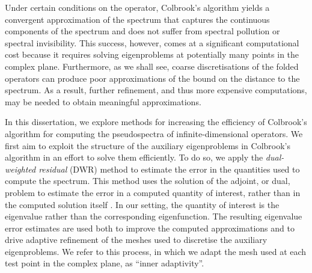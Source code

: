 Under certain conditions on the operator, Colbrook's algorithm yields a convergent approximation of the spectrum that captures the continuous components of the spectrum and does not suffer from spectral pollution or spectral invisibility. This success, however, comes at a significant computational cost because it requires solving eigenproblems at potentially many points in the complex plane. Furthermore, as we shall see, coarse discretisations of the folded operators can produce poor approximations of the bound on the distance to the spectrum. 
As a result, further refinement, and thus more expensive computations, may be needed to obtain meaningful approximations.







In this dissertation, we explore methods for increasing the efficiency of Colbrook's algorithm for computing the pseudospectra of infinite-dimensional operators. We first aim to exploit the structure of the auxiliary eigenproblems in Colbrook's algorithm in an effort to solve them efficiently. To do so, we apply the \textit{dual-weighted residual} (DWR) method to estimate the error in the quantities used to compute the spectrum. This method uses the solution of the adjoint, or dual, problem to estimate the error in a computed quantity of interest, rather than in the computed solution itself \cite{Bangerth, Heuveline, Becker}. In our setting, the quantity of interest is the eigenvalue rather than the corresponding eigenfunction. The resulting eigenvalue error estimates are used both to improve the computed approximations and to drive adaptive refinement of the meshes used to discretise the auxiliary eigenproblems.
 We refer to this process, in which we adapt the mesh used at each test point in the complex plane, as ``inner adaptivity''.

